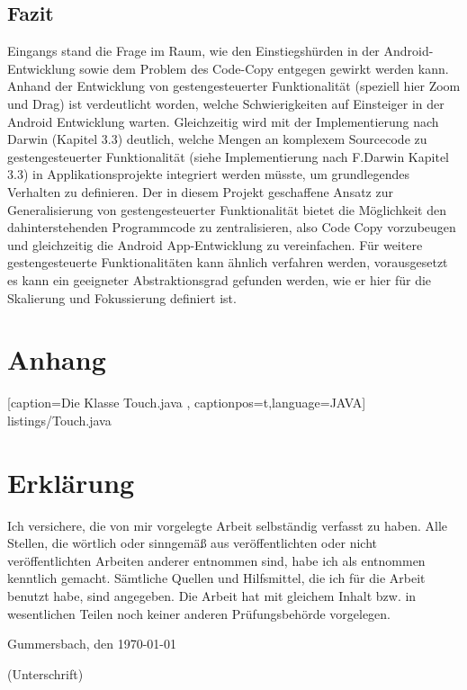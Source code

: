\documentclass[12pt,oneside,a4paper,bibtotoc,liststotoc]{scrreprt}
\begin{document}
\section{Fazit}
Eingangs stand die Frage im Raum, wie den Einstiegshürden in der Android-Entwicklung sowie dem Problem des Code-Copy entgegen gewirkt werden kann. Anhand der Entwicklung von gestengesteuerter Funktionalität (speziell hier Zoom und Drag) ist verdeutlicht worden, welche Schwierigkeiten auf Einsteiger in der Android Entwicklung warten. Gleichzeitig wird mit der Implementierung nach Darwin (Kapitel 3.3) deutlich, welche Mengen an komplexem Sourcecode zu gestengesteuerter  Funktionalität (siehe Implementierung nach F.Darwin Kapitel 3.3) in Applikationsprojekte integriert werden müsste, um grundlegendes Verhalten zu definieren. Der in diesem Projekt geschaffene Ansatz zur Generalisierung von gestengesteuerter Funktionalität bietet die Möglichkeit den dahinterstehenden Programmcode zu zentralisieren, also Code Copy vorzubeugen und gleichzeitig die Android App-Entwicklung zu vereinfachen.
Für weitere gestengesteuerte Funktionalitäten kann ähnlich verfahren werden, vorausgesetzt es kann ein geeigneter Abstraktionsgrad gefunden werden, wie er hier für die Skalierung und Fokussierung definiert ist.

{}

\appendix

\chapter*{Anhang}
 
    [caption={Die Klasse Touch.java}
       \label{lst:javaclass},
       captionpos=t,language=JAVA]
 {listings/Touch.java}
\chapter{Erklärung}

Ich versichere, die von mir vorgelegte Arbeit selbständig verfasst zu
haben. Alle Stellen, die wörtlich oder sinngemäß aus veröffentlichten
oder nicht veröffentlichten Arbeiten anderer entnommen sind, habe ich
als entnommen kenntlich gemacht. Sämtliche Quellen und Hilfsmittel,
die ich für die Arbeit benutzt habe, sind angegeben. Die Arbeit hat
mit gleichem Inhalt bzw. in wesentlichen Teilen noch keiner anderen
Prüfungsbehörde vorgelegen.

\bigskip

Gummersbach, den \today

\bigskip

\bigskip

\bigskip

\bigskip

\bigskip

\bigskip

(Unterschrift)
\end{document}
